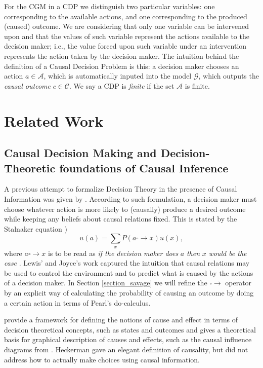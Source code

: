 \documentclass{svjour3}                     %
\begin{document}
For the CGM in a CDP we distinguish two particular variables: one corresponding to the available actions, and one corresponding to the produced (caused) outcome. We are considering that only one variable can be intervened upon and that the values of such variable represent the actions available to the decision maker; i.e., the value forced upon such variable under an intervention represents the action taken by the decision maker. The intuition behind the definition of a Causal Decision Problem is this: a decision maker chooses an action $a \in \mathcal{A}$, which is automatically inputed into the model $\mathcal{G}$, which outputs the \textit{causal outcome} $c \in \mathcal{C}$. We say a CDP is \textit{finite} if the set $\mathcal{A}$ is finite.

\section{Related Work}
\label{related_work}
\subsection{Causal Decision Making and Decision-Theoretic foundations of Causal Inference}
\label{joyce_theory}
A previous attempt to formalize Decision Theory in the presence of Causal Information was given by \cite{lewis1981causal,joyce1999foundations}. According to such formulation, a decision maker must choose whatever action is more likely to (causally) produce a desired outcome while keeping any beliefs about causal relations fixed. This is stated by the Stalnaker equation \citep{stalnaker1968})
\begin{equation}
u(a)=\sum_{x} P(a \square \to x)u(x),
\end{equation}
\noindent
where $a \square \to x$ is to be read as \textit{if the decision maker does} $a$ \textit{then} $x$ \textit{would be the case} \citep{gibbard1978counterfactuals,kleinberg2013causality}. Lewis' and Joyce's work captured the intuition that causal relations may be used to control the environment and to predict what is caused by the actions of a decision maker. In Section \ref{section_savage} we will refine the $\square \to$ operator by an explicit way of calculating the probability of causing an outcome by doing a certain action in terms of Pearl's do-calculus.

\cite{heckerman1995decision} provide a framework for defining the notions of cause and effect in terms of decision theoretical concepts, such as states and outcomes and gives a theoretical basis for graphical description of causes and effects, such as the causal influence diagrams from \citep{dawid2002influence}. Heckerman gave an elegant definition of causality, but did not address how to actually make choices using causal information.
\end{document}
